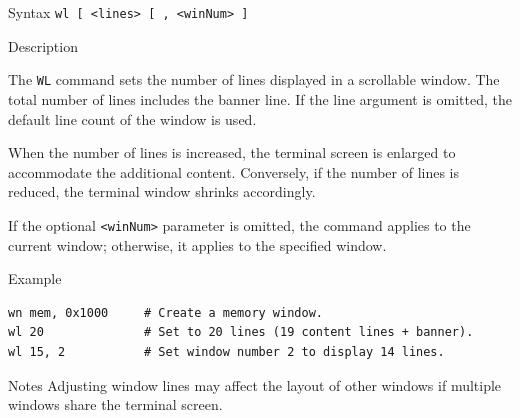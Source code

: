 %
%
\pagebreak
{}

\begin{iPageDescEntry}{Syntax}
\texttt{wl [ <lines> [ , <winNum> ]} \\
\end{iPageDescEntry}

\begin{iPageDescEntry}{Description}

The \texttt{WL} command sets the number of lines displayed in a scrollable window. The total number of lines includes the banner line. If the line argument is omitted, the default line count of the window is used.

When the number of lines is increased, the terminal screen is enlarged to accommodate the additional content. Conversely, if the number of lines is reduced, the terminal window shrinks accordingly.

If the optional \texttt{<winNum>} parameter is omitted, the command applies to the current window; otherwise, it applies to the specified window.

\end{iPageDescEntry}

\begin{iPageDescOpEntry}{Example}
\begin{lstlisting}[style=iPageOpStyle]
wn mem, 0x1000     # Create a memory window.
wl 20              # Set to 20 lines (19 content lines + banner).
wl 15, 2           # Set window number 2 to display 14 lines.
\end{lstlisting}
\end{iPageDescOpEntry}

\begin{iPageDescEntry}{Notes}
Adjusting window lines may affect the layout of other windows if multiple
windows share the terminal screen.
\end{iPageDescEntry}
